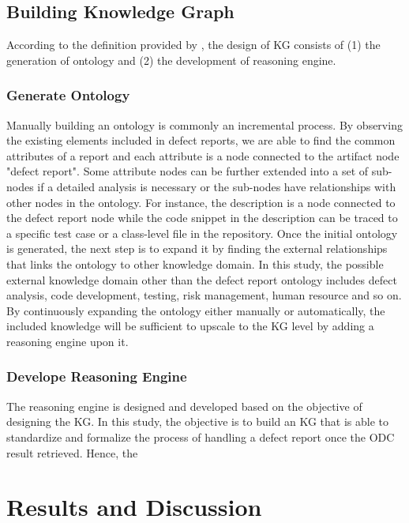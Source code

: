 \documentclass[12pt] {article}
\begin{document}
\subsection{Building Knowledge Graph}
According to the definition provided by , the design of KG consists of (1) the generation of ontology and (2) the development of reasoning engine.
\subsubsection{Generate Ontology}
Manually building an ontology is commonly an incremental process.
By observing the existing elements included in defect reports, we are able to find the common attributes of a report and each attribute is a node connected to the artifact node "defect report".
Some attribute nodes can be further extended into a set of sub-nodes if a detailed analysis is necessary or the sub-nodes have relationships with other nodes in the ontology.  
For instance, the description is a node connected to the defect report node while the code snippet in the description can be traced to a specific test case or a class-level file in the repository.
Once the initial ontology is generated, the next step is to expand it by finding the external relationships that links the ontology to other knowledge domain.
In this study, the possible external knowledge domain other than the defect report ontology includes defect analysis, code development, testing, risk management, human resource and so on.  
By continuously expanding the ontology either manually or automatically, the included knowledge will be sufficient to upscale to the KG level by adding a reasoning engine upon it.
\subsubsection{Develope Reasoning Engine}
The reasoning engine is designed and developed based on the objective of designing the KG.
In this study, the objective is to build an KG that is able to standardize and formalize the process of handling a defect report once the ODC result retrieved.
Hence, the 

\section{Results and Discussion}
\end{document}

